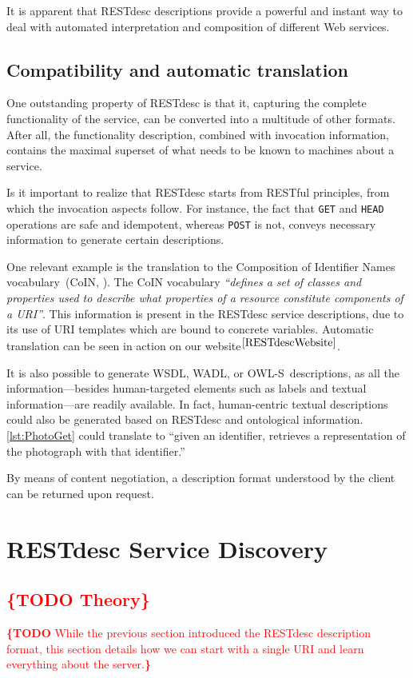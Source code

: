 \documentclass[runningheads,a4paper, twocolumn]{llncs}
\newcommand{\todo}[1]{\noindent\textcolor{red}{{\bf \{TODO} #1{\bf \}}}}
\newcommand{\owls}{\mbox{OWL-S}}
\begin{document}
It is apparent that RESTdesc descriptions provide a powerful and instant way to deal with automated interpretation and composition of different Web services.


\subsection{Compatibility and automatic translation}
One outstanding property of RESTdesc is that it, capturing the complete functionality of the service, can be converted into a multitude of other formats. After all, the functionality description, combined with invocation information, contains the maximal superset of what needs to be known to machines about a service.

Is it important to realize that RESTdesc starts from RESTful principles, from which the invocation aspects follow. For instance, the fact that \Verb!GET! and \Verb!HEAD! operations are safe and idempotent, whereas \Verb!POST! is not, conveys necessary information to generate certain descriptions.

One relevant example is the translation to the Composition of Identifier Names vocabulary~(CoIN, \cite{CoIN}). The CoIN vocabulary \emph{``defines a set of classes and properties used to describe what properties of a resource constitute components of a URI''}. This information is present in the RESTdesc service descriptions, due to its use of URI templates which are bound to concrete variables. Automatic translation can be seen in action on our website$^{\ref{RESTdescWebsite}}$.

It is also possible to generate WSDL, WADL, or \owls\ descriptions, as all the information---besides human-targeted elements such as labels and textual information---are readily available. In fact, human-centric textual descriptions could also be generated based on RESTdesc and ontological information. \autoref{lst:PhotoGet} could translate to ``given an identifier, retrieves a representation of the photograph with that identifier.''

By means of content negotiation, a description format understood by the client can be returned upon request.


\section{RESTdesc Service Discovery} \label{sec:restdesc-discovery}
\subsection{\todo{Theory}}
\todo{While the previous section introduced the RESTdesc description format, this section details how we can start with a single URI and learn everything about the server.}
\end{document}

